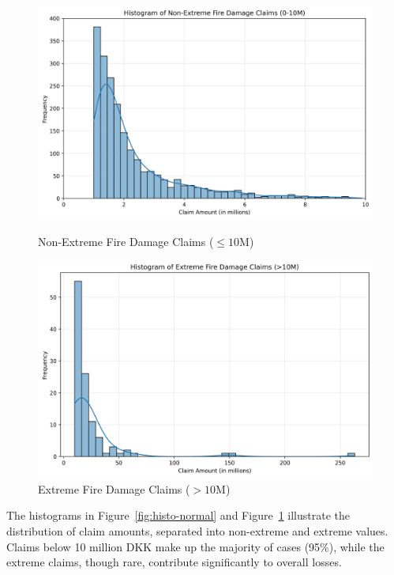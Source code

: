 \documentclass[8pt]{article}
\begin{document}
\begin{figure}[h]
    \centering
    \begin{minipage}{0.48\textwidth}
        \centering
        \includegraphics[width=\linewidth]{Figures/histogram_normal.png}
        \caption{Non-Extreme Fire Damage Claims ($\leq10$M)}
        \label{fig:histo-normal}
    \end{minipage}
    \hfill
    \begin{minipage}{0.48\textwidth}
        \centering
        \includegraphics[width=\linewidth]{Figures/histogram_extreme.png}
        \caption{Extreme Fire Damage Claims ($>10$M)}
        \label{fig:histo-extreme}
    \end{minipage}
\end{figure}

The histograms in Figure~\ref{fig:histo-normal} and Figure~\ref{fig:histo-extreme} illustrate the distribution of claim amounts, separated into non-extreme and extreme values. Claims below 10 million DKK make up the majority of cases (95\%), while the extreme claims, though rare, contribute significantly to overall losses.
\end{document}
